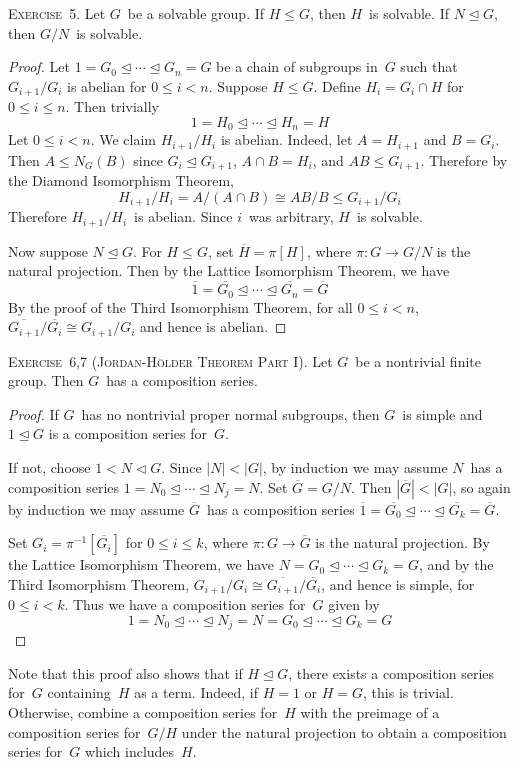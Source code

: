 \documentclass[letterpaper]{article}
\newcommand{\exercise}[1]{\goodbreak\noindent\textsc{Exercise~{#1}.}}
\newcommand{\iso}{\cong}
\newcommand{\sect}{\cap}
\newcommand{\subgroup}{\le}
\newcommand{\normal}{\trianglelefteq}
\newcommand{\normalne}{\triangleleft}
\newcommand{\res}[1]{\overline{#1}}
\newcommand{\ord}[1]{|{#1}|}
\begin{document}
\exercise{5}
Let $G$~be a solvable group. If $H\subgroup G$, then $H$~is solvable. If $N\normal G$, then $G/N$~is solvable.
\begin{proof}
Let $1=G_0\normal\cdots\normal G_n=G$ be a chain of subgroups in~$G$ such that $G_{i+1}/G_i$ is abelian for $0\le i<n$. Suppose $H\subgroup G$. Define $H_i=G_i\sect H$ for $0\le i\le n$. Then trivially
$$1=H_0\normal\cdots\normal H_n=H$$
Let $0\le i<n$. We claim $H_{i+1}/H_i$ is abelian. Indeed, let $A=H_{i+1}$ and $B=G_i$. Then $A\subgroup N_G(B)$ since $G_i\normal G_{i+1}$, $A\sect B=H_i$, and $AB\subgroup G_{i+1}$. Therefore by the Diamond Isomorphism Theorem,
$$H_{i+1}/H_i=A/(A\sect B)\iso AB/B\subgroup G_{i+1}/G_i$$
Therefore $H_{i+1}/H_i$~is abelian. Since $i$~was arbitrary, $H$~is solvable.

Now suppose $N\normal G$. For $H\subgroup G$, set $\res{H}=\pi[H]$, where $\pi:G\to G/N$ is the natural projection. Then by the Lattice Isomorphism Theorem, we have
$$\res{1}=\res{G_0}\normal\cdots\normal\res{G_n}=\res{G}$$
By the proof of the Third Isomorphism Theorem, for all $0\le i<n$, $\res{G_{i+1}}/\res{G_i}\iso G_{i+1}/G_i$ and hence is abelian.
\end{proof}

\exercise{6,7 (Jordan-H\"older Theorem Part I)}
Let $G$~be a nontrivial finite group. Then $G$~has a composition series.
\begin{proof}
If $G$~has no nontrivial proper normal subgroups, then $G$~is simple and $1\normal G$ is a composition series for~$G$.

If not, choose $1<N\normalne G$. Since $\ord{N}<\ord{G}$, by induction we may assume $N$~has a composition series $1=N_0\normal\cdots\normal N_j=N$. Set $\res{G}=G/N$. Then $\ord{\res{G}}<\ord{G}$, so again by induction we may assume $\res{G}$~has a composition series $\res{1}=\res{G_0}\normal\cdots\normal\res{G_k}=\res{G}$.

Set $G_i=\pi^{-1}[\res{G_i}]$ for $0\le i\le k$, where $\pi:G\to\res{G}$ is the natural projection. By the Lattice Isomorphism Theorem, we have
$N=G_0\normal\cdots\normal G_k=G$, and by the Third Isomorphism Theorem, $G_{i+1}/G_i\iso\res{G_{i+1}}/\res{G_i}$, and hence is simple, for $0\le i<k$. Thus we have a composition series for~$G$ given by
$$1=N_0\normal\cdots\normal N_j=N=G_0\normal\cdots\normal G_k=G$$
\end{proof}
\noindent Note that this proof also shows that if $H\normal G$, there exists a composition series for~$G$ containing~$H$ as a term. Indeed, if $H=1$ or $H=G$, this is trivial. Otherwise, combine a composition series for~$H$ with the preimage of a composition series for~$G/H$ under the natural projection to obtain a composition series for~$G$ which includes~$H$.
\end{document}
